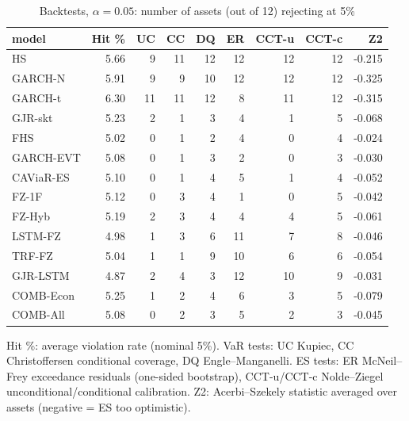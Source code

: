 \begin{table}[htbp]
\centering
\footnotesize
\caption{Backtests, $\alpha=0.05$: number of assets (out of 12) rejecting at 5\%}
\label{tab:bt_a050}
\begin{tabular}{lrrrrrrrr}
\toprule
model & Hit \% & UC & CC & DQ & ER & CCT-u & CCT-c & Z2 \\
\midrule
HS & 5.66 & 9 & 11 & 12 & 12 & 12 & 12 & -0.215 \\
GARCH-N & 5.91 & 9 & 9 & 10 & 12 & 12 & 12 & -0.325 \\
GARCH-t & 6.30 & 11 & 11 & 12 & 8 & 11 & 12 & -0.315 \\
GJR-skt & 5.23 & 2 & 1 & 3 & 4 & 1 & 5 & -0.068 \\
FHS & 5.02 & 0 & 1 & 2 & 4 & 0 & 4 & -0.024 \\
GARCH-EVT & 5.08 & 0 & 1 & 3 & 2 & 0 & 3 & -0.030 \\
CAViaR-ES & 5.10 & 0 & 1 & 4 & 5 & 1 & 4 & -0.052 \\
FZ-1F & 5.12 & 0 & 3 & 4 & 1 & 0 & 5 & -0.042 \\
FZ-Hyb & 5.19 & 2 & 3 & 4 & 4 & 4 & 5 & -0.061 \\
LSTM-FZ & 4.98 & 1 & 3 & 6 & 11 & 7 & 8 & -0.046 \\
TRF-FZ & 5.04 & 1 & 1 & 9 & 10 & 6 & 6 & -0.054 \\
GJR-LSTM & 4.87 & 2 & 4 & 3 & 12 & 10 & 9 & -0.031 \\
COMB-Econ & 5.25 & 1 & 2 & 4 & 6 & 3 & 5 & -0.079 \\
COMB-All & 5.08 & 0 & 2 & 3 & 5 & 2 & 3 & -0.045 \\
\bottomrule
\end{tabular}
\par\smallskip\parbox{\linewidth}{\scriptsize Hit \%: average violation rate (nominal 5\%). VaR tests: UC Kupiec, CC Christoffersen conditional coverage, DQ Engle--Manganelli. ES tests: ER McNeil--Frey exceedance residuals (one-sided bootstrap), CCT-u/CCT-c Nolde--Ziegel unconditional/conditional calibration. Z2: Acerbi--Szekely statistic averaged over assets (negative = ES too optimistic).}
\end{table}